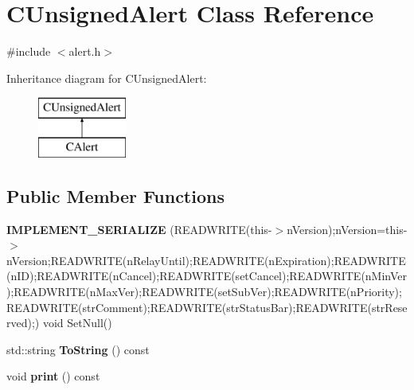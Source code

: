 \hypertarget{class_c_unsigned_alert}{}\section{C\+Unsigned\+Alert Class Reference}
\label{class_c_unsigned_alert}


{\ttfamily \#include $<$alert.\+h$>$}

Inheritance diagram for C\+Unsigned\+Alert\+:\begin{figure}[H]
\begin{center}
\leavevmode
\includegraphics[height=2.000000cm]{class_c_unsigned_alert}
\end{center}
\end{figure}
\subsection*{Public Member Functions}
\begin{DoxyCompactItemize}
\item 
\mbox{\label{class_c_unsigned_alert_ac2149aa59772788d405b80504465b948}} 
{\bfseries I\+M\+P\+L\+E\+M\+E\+N\+T\+\_\+\+S\+E\+R\+I\+A\+L\+I\+ZE} (R\+E\+A\+D\+W\+R\+I\+TE(this-\/$>$n\+Version);n\+Version=this-\/$>$n\+Version;R\+E\+A\+D\+W\+R\+I\+TE(n\+Relay\+Until);R\+E\+A\+D\+W\+R\+I\+TE(n\+Expiration);R\+E\+A\+D\+W\+R\+I\+TE(n\+ID);R\+E\+A\+D\+W\+R\+I\+TE(n\+Cancel);R\+E\+A\+D\+W\+R\+I\+TE(set\+Cancel);R\+E\+A\+D\+W\+R\+I\+TE(n\+Min\+Ver);R\+E\+A\+D\+W\+R\+I\+TE(n\+Max\+Ver);R\+E\+A\+D\+W\+R\+I\+TE(set\+Sub\+Ver);R\+E\+A\+D\+W\+R\+I\+TE(n\+Priority);R\+E\+A\+D\+W\+R\+I\+TE(str\+Comment);R\+E\+A\+D\+W\+R\+I\+TE(str\+Status\+Bar);R\+E\+A\+D\+W\+R\+I\+TE(str\+Reserved);) void Set\+Null()
\item 
\mbox{\label{class_c_unsigned_alert_a1ba948e1de4803565ec0dbec267eadb4}} 
std\+::string {\bfseries To\+String} () const
\item 
\mbox{\label{class_c_unsigned_alert_ad1f5778ba861e7ec6212f3c59f55d11d}} 
void {\bfseries print} () const
\end{DoxyCompactItemize}
